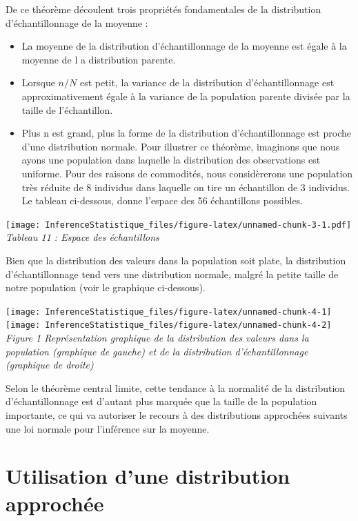 \documentclass[]{book}
\providecommand{\tightlist}{%
  \setlength{\itemsep}{0pt}\setlength{\parskip}{0pt}}
\theoremstyle{definition}
\theoremstyle{definition}
\theoremstyle{definition}
\theoremstyle{remark}
\begin{document}
De ce théorème découlent trois propriétés fondamentales de la
distribution d'échantillonnage de la moyenne :

\begin{itemize}
\tightlist
\item
  La moyenne de la distribution d'échantillonnage de la moyenne est
  égale à la moyenne de l a distribution parente.
\item
  Lorsque \(n/N\) est petit, la variance de la distribution
  d'échantillonnage est approximativement égale à la variance de la
  population parente divisée par la taille de l'échantillon.
\item
  Plus n est grand, plus la forme de la distribution d'échantillonnage
  est proche d'une distribution normale. Pour illustrer ce théorème,
  imaginons que nous ayons une population dans laquelle la distribution
  des observations est uniforme. Pour des raisons de commodités, nous
  considèrerons une population très réduite de 8 individus dans laquelle
  on tire un échantillon de 3 individus. Le tableau ci-dessous, donne
  l'espace des 56 échantillons possibles.
\end{itemize}

\texttt{[image: InferenceStatistique\_files/figure-latex/unnamed-chunk-3-1.pdf]}
\emph{Tableau 11 : Espace des échantillons}

Bien que la distribution des valeurs dans la population soit plate, la
distribution d'échantillonnage tend vers une distribution normale,
malgré la petite taille de notre population (voir le graphique
ci-dessous).

\texttt{[image: InferenceStatistique\_files/figure-latex/unnamed-chunk-4-1]}
\texttt{[image: InferenceStatistique\_files/figure-latex/unnamed-chunk-4-2]}
\emph{Figure 1 Représentation graphique de la distribution des valeurs
dans la population (graphique de gauche) et de la distribution
d'échantillonnage (graphique de droite)}

Selon le théorème central limite, cette tendance à la normalité de la
distribution d'échantillonnage est d'autant plus marquée que la taille
de la population importante, ce qui va autoriser le recours à des
distributions approchées suivants une loi normale pour l'inférence sur
la moyenne.

\hypertarget{utilisation-dune-distribution-approchee-1}{%
\section{Utilisation d'une distribution
approchée}\label{utilisation-dune-distribution-approchee-1}}
\end{document}
